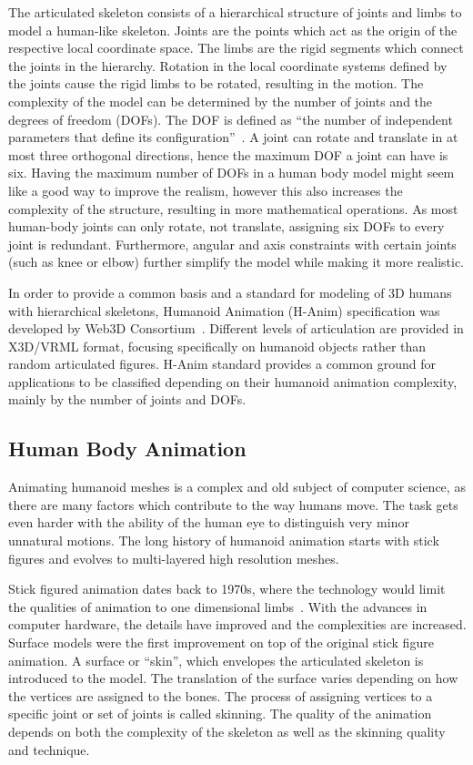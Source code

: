 The articulated skeleton consists of a hierarchical structure of joints and limbs to model a human-like skeleton. Joints are the points which act as the origin of the respective local coordinate space. The limbs are the rigid segments which connect the joints in the hierarchy. Rotation in the local coordinate systems defined by the joints cause the rigid limbs to be rotated, resulting in the motion. The complexity of the model can be determined by the number of joints and the degrees of freedom (DOFs). The DOF is defined as ``the number of independent parameters that define its configuration''~\cite{Lazard2013}. A joint can rotate and translate in at most three orthogonal directions, hence the maximum DOF a joint can have is six. Having the maximum number of DOFs in a human body model might seem like a good way to improve the realism, 
however this also increases the complexity of the structure, resulting in more mathematical operations. As most human-body joints can only rotate, not translate, assigning six DOFs to every joint is redundant. Furthermore, angular and axis constraints with certain joints (such as knee or elbow) further simplify the model while making it more realistic. 

In order to provide a common basis and a standard for modeling of 3D humans with hierarchical skeletons, Humanoid Animation (H-Anim) specification was developed by Web3D Consortium~\cite{HANIM}. Different levels of articulation are provided in X3D/VRML format, focusing specifically on humanoid objects rather than random articulated figures. H-Anim standard provides a common ground for applications to be classified depending on their humanoid animation complexity, mainly by the number of joints and DOFs. 

\subsection{Human Body Animation}
\label{section_related_human_body_animation}

Animating humanoid meshes is a complex and old subject of computer science, as there are many factors which contribute to the way humans move. The task gets even harder with the ability of the human eye to distinguish very minor unnatural motions. The long history of humanoid animation starts with stick figures and evolves to multi-layered high resolution meshes. 

Stick figured animation dates back to 1970s, where the technology would limit the qualities of animation to one dimensional limbs~\cite{Badler1979}. With the advances in computer hardware, the details have improved and the complexities are increased. Surface models were the first improvement on top of the original stick figure animation. A surface or ``skin'', which envelopes the articulated skeleton is introduced to the model. The translation of the surface varies depending on how the vertices are assigned to the bones. The process of assigning vertices to a specific joint or set of joints is called skinning. The quality of the animation depends on both the complexity of the skeleton as well as the skinning quality and technique. 

